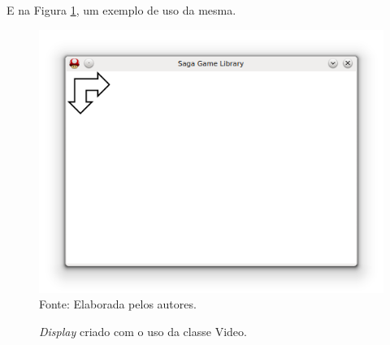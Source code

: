 %
%
E na Figura \ref{display}, um exemplo de uso da mesma.
%
%

%
%
\begin{figure}[H]
    \centering
    \caption{\textit{Display} criado com o uso da classe Video.}
    \label{display}
    \includegraphics[scale = 0.40]{Imagens/display.png}
    \\Fonte: Elaborada pelos autores.
\end{figure}
%
%
